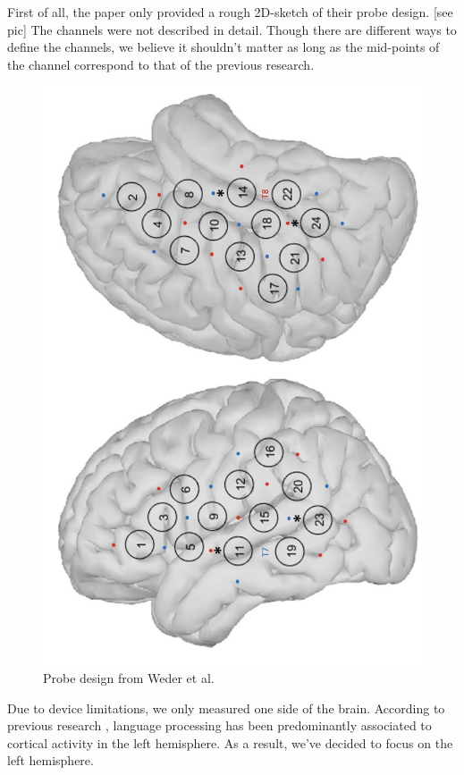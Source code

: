First of all, the paper only provided a rough 2D-sketch of their probe design. [see pic] The channels were not described in detail. Though there are different ways to define the channels, we believe it shouldn't matter as long as the mid-points of the channel correspond to that of the previous research.

\begin{figure}[H]
  \centering
    \includegraphics[scale=.5]{bilder/weder_probe.jpg}
  \caption{Probe design from Weder et al.}
  \label{fig:somesignal}
\end{figure}

Due to device limitations, we only measured one side of the brain. According to previous research \cite {Frost1999-vs} , language processing has been predominantly associated to cortical activity in the left hemisphere. As a result, we've decided to focus on the left hemisphere.

